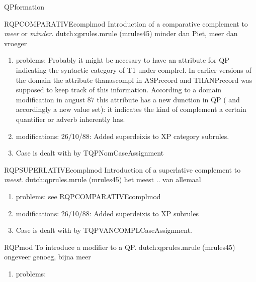 \begin{mruleclass}{QPformation}
\begin{members}
\begin{member}
\end{member}
\begin{member}
 RQPCOMPARATIVEcomplmod
 Introduction of a comparative complement to {\em meer} or
{\em minder}.
\file dutch:qprules.mrule (mrules45)
\semantics \nosemantics
\example minder dan Piet, meer dan vroeger
\remarks\mbox{}
\begin{enumerate}
\item problems: Probably it might be necesary to have an attribute for QP 
indicating the syntactic category of T1 under complrel. In earlier versions of
the domain
the attribute thanascompl in ASPrecord and THANPrecord was supposed to
keep track of this information. According to a domain modification in august 87
this attribute has a new dunction in QP ( and accordingly a new value set): it
indicates the kind of complement a certain quantifier or adverb inherently has.
\\ 
\item modifications: 26/10/88: Added superdeixis to XP category subrules.\\
\item Case is dealt with by TQPNomCaseAssignment
\end{enumerate}

\end{member}
\begin{member}
 RQPSUPERLATIVEcomplmod
 Introduction of a superlative complement to {\em meest}.
\file dutch:qprules.mrule (mrules45)
\semantics \nosemantics
\example het meest .. van allemaal
\remarks\mbox{}
\begin{enumerate}
\item problems: see RQPCOMPARATIVEcomplmod

\item modifications: 26/10/88: Added superdeixis to XP subrules\\
\item Case is dealt with by TQPVANCOMPLCaseAssignment.
\end{enumerate}

\end{member}
\begin{member}
 RQPmod
 To introduce a modifier to a QP.
\file dutch:qprules.mrule (mrules45)
\semantics \nosemantics
\example ongeveer genoeg, bijna meer
\remarks\mbox{}
\begin{enumerate}
\item problems:\\


\end{enumerate}
\end{member}
\end{members}
\end{mruleclass}
